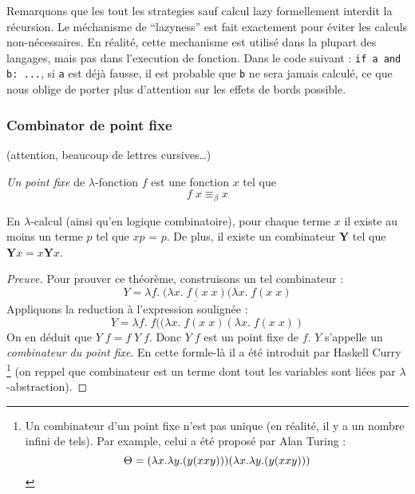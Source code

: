 Remarquons que les tout les strategies sauf calcul lazy formellement interdit la récursion.
Le méchanisme de ``lazyness'' est fait exactement pour éviter les calculs non-nécessaires.
En réalité, cette mechanisme est utilisé dans la plupart des langages, mais pas dans l'execution de fonction. Dans le code suivant : \verb|if a and b: ...|, si \verb|a| est déjà fausse, il est probable que \verb|b| ne sera jamais calculé, ce que nous oblige de porter plus d'attention sur les effets de bords possible.

\subsubsection*{Combinator de point fixe} (attention, beaucoup de lettres cursives\ldots)
\begin{definition}
	\emph{Un point fixe} de $\lambda$-fonction $f$ est une fonction $x$ tel que $$f \; x \equiv_\beta x$$
\end{definition}
\begin{theorem}
	En $\lambda$-calcul (ainsi qu'en logique combinatoire), pour chaque terme $x$ il existe au moins un terme $p$ tel que $xp$ = $p$.
	De plus, il existe un combinateur $\mathbf{Y}$ tel que $\mathbf{Y} x = x \mathbf{Y} x$.
\end{theorem}
\begin{proof}[Preuve]
	Pour prouver ce théorème, construisons un tel combinateur :
	$$Y = \lambda f. \; \underline{(\lambda x. \; f(x \; x)} (\lambda x. \; f(x \; x)$$
	Appliquons la reduction à l'expression soulignée :
	$$Y = \lambda f. \; f ((\lambda x. \; f(x \; x) (\lambda x. \; f(x \; x))$$
	On en déduit que $Y \; f = f \; Y \; f$.
	Donc $Y \; f$ est un point fixe de $f$.
	$Y$ s'appelle un \emph{combinateur du point fixe}.
	En cette formle-là il a été introduit par Haskell Curry
	\footnote{
		Un combinateur d'un point fixe n'est pas unique (en réalité, il y a un nombre infini de tels).
		Par example, celui a été proposé par Alan Turing : $$\Theta = (\lambda x.\lambda y.(y(xxy)))(\lambda x.\lambda y.(y(xxy)))$$
	}
	(on reppel que combinateur est un terme dont tout les variables sont liées par $\lambda$-abstraction).
\end{proof}

